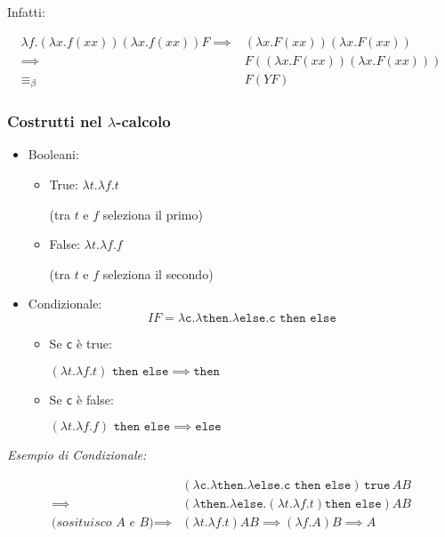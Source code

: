 \documentclass[a4paper,10pt]{article}
\begin{document}
Infatti:

\[ \begin{aligned}
    \lambda f.(\lambda x.f(xx))(\lambda x.f(xx)) F \implies &(\lambda x.F(xx))(\lambda x.F(xx))\\
    \implies &F((\lambda x.F(xx))(\lambda x.F(xx)))\\
    \equiv_\beta\, &F(YF)
   \end{aligned}
 \]
 \newpage
 \subsubsection{Costrutti nel $\lambda$-calcolo}
 \begin{multicols}{2}
  
 \begin{itemize}
  \item Booleani:
  \begin{itemize}
   \item True: $\lambda t.\lambda f.t$
   
   (tra $t$ e $f$ seleziona il primo)
   \item False: $\lambda t.\lambda f.f$
   
   (tra $t$ e $f$ seleziona il secondo)
  \end{itemize}
   
 \item Condizionale:
 \[ IF = \lambda \texttt{c}.\lambda \texttt{then}.\lambda \texttt{else}. \texttt{c then else} \]
 
 \begin{itemize}
 \item Se \texttt{c} è true: 
 
 $(\lambda t.\lambda f.t) \texttt{ then else} \implies \texttt{then}$
 
 \item Se \texttt c è false: 
 
 $(\lambda t.\lambda f.f) \texttt{ then else} \implies \texttt{else}$
\end{itemize}

 
 \end{itemize}
 \end{multicols}

 \textit{Esempio di Condizionale:}
 
 \[\begin{aligned}
&(\lambda \texttt{c} .\lambda \texttt{then} .\lambda \texttt{else}. \texttt{c then else}) \,\texttt{true}\, A B\\
\implies &(\lambda \texttt{then}.\lambda \texttt{else}.(\lambda t.\lambda f.t) \texttt{then else}) A B\\
\textit{(sosituisco A e B)} \implies &(\lambda t .\lambda f.t)A B \implies (\lambda f.A)B \implies A
\end{aligned}\]
\end{document}
